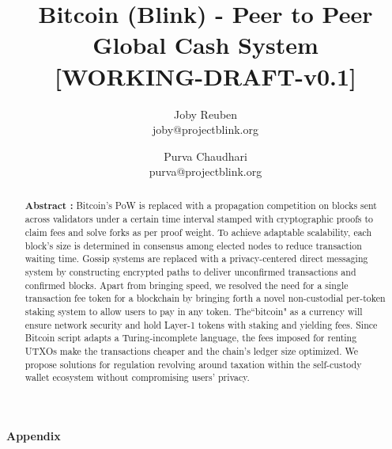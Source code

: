 \documentclass[a4paper,10pt]{article}
\title{
 \large \textbf{Bitcoin (Blink) - Peer to Peer Global Cash System}\\
\vspace{6mm}
\scriptsize[WORKING-DRAFT-v0.1]
}
\author{ \myfontt Joby Reuben \\ \myfontt joby@projectblink.org \and  \myfontt Purva Chaudhari \\ \myfontt purva@projectblink.org}
\date{}
\begin{document}
\maketitle
\begin{abstract}
\noindent \textbf{Abstract :} Bitcoin's PoW is replaced with a propagation competition on blocks sent across validators under a certain time interval stamped with cryptographic proofs to claim fees and solve forks as per proof weight. To achieve adaptable scalability, each block's size is determined in consensus among elected nodes to reduce transaction waiting time. Gossip systems are replaced with a privacy-centered direct messaging system by constructing encrypted paths to deliver unconfirmed transactions and confirmed blocks. Apart from bringing speed, we resolved the need for a single transaction fee token for a blockchain by bringing forth a novel non-custodial per-token staking system to allow users to pay in any token. The``bitcoin" as a currency will ensure network security and hold Layer-1 tokens with staking and yielding fees. Since Bitcoin script adapts a Turing-incomplete language, the fees imposed for renting UTXOs make the transactions cheaper and the chain's ledger size optimized. We propose solutions for regulation revolving around taxation within the self-custody wallet ecosystem without compromising users' privacy. 
\end{abstract}














\vspace{5mm}
\appendix
\noindent \Large \textbf{Appendix}



















\end{document}
